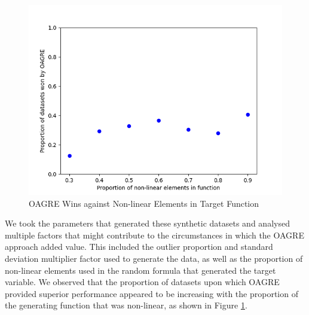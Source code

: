\documentclass[graybox]{svmult}
\begin{document}
\begin{table}
\caption{Overall Results}
\label{tab:results}
\end{table}

\begin{figure}
\centering
\includegraphics[scale=0.7]{images/wins_vs_nonlinear_prop.png}
\caption{OAGRE Wins against Non-linear Elements in Target Function}
\label{fig:nonlinear}
\end{figure}

We took the parameters that generated these synthetic datasets and analysed multiple factors that might contribute
to the circumstances in which the OAGRE approach added value. This included the outlier proportion and standard deviation
multiplier factor used to generate the data, as well as the proportion of non-linear elements used in the random formula that
generated the target variable. We observed that the proportion of datasets upon which OAGRE provided superior performance
appeared to be increasing with the proportion of the generating function that was non-linear, as shown in Figure \ref{fig:nonlinear}.
\end{document}
